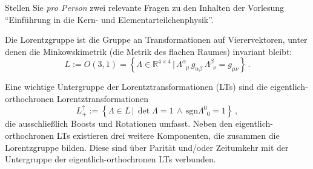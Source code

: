\documentclass{exercise}
\begin{document}
\clearpage
\makeheader

Stellen Sie \emph{pro Person} zwei relevante Fragen zu den Inhalten der Vorlesung \enquote{Einf\"uhrung in die Kern- und Elementarteilchenphysik}.


Die Lorentzgruppe ist die Gruppe an Transformationen auf Vierervektoren, unter denen die Minkowskimetrik (die Metrik des flachen Raumes) invariant bleibt:
\begin{equation}
    L := O(3,1) =  \left\{ \Lambda \in \mathbb{R}^{4 \times 4} \, | \, \Lambda_{\phantom{\mu} \mu}^\alpha \, g_{\alpha \beta} \, \Lambda_{\phantom{\nu} \nu}^\beta   = g_{\mu \nu} \right\} \,.
\end{equation} 

Eine wichtige Untergruppe der Lorentztransformationen (LTs) sind die eigentlich-orthochronen Lorentztransformationen
\begin{equation}
    L_+^\uparrow := \left\{ \Lambda \in L \, | \, \det \Lambda = 1 \, \wedge \, \text{sgn} \Lambda^0_{\phantom{0} 0} = 1 \right\} \,,
\end{equation} 
die ausschließlich Boosts und Rotationen umfasst.
Neben den eigentlich-orthochronen LTs existieren drei weitere Komponenten, die zusammen die Lorentzgruppe bilden.
Diese sind über Parit\"at und/oder Zeitumkehr mit der Untergruppe der eigentlich-orthochronen LTs verbunden.
\end{document}
